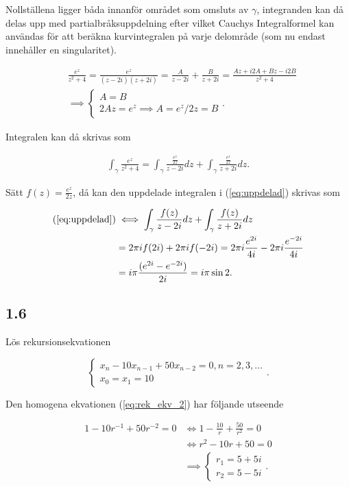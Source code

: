 \documentclass[a4paper]{article}
\begin{document}
Nollställena ligger båda innanför området som omsluts av $\gamma$, integranden kan då delas upp med partialbråksuppdelning efter vilket Cauchys Integralformel kan användas för att beräkna kurvintegralen på varje delområde (som nu endast innehåller en singularitet).

\begin{align*}
	&\frac{e^z}{z^2 + 4} = \frac{e^z}{(z-2i)(z+2i)} = \frac{A}{z-2i} + \frac{B}{z+2i} = \frac{Az + i2A + Bz - i2B}{z^2 + 4}\\
	&\implies	\begin{cases}
					A = B\\
					2Az = e^z \implies A = e^z/2z = B
				\end{cases}.
\end{align*}

Integralen kan då skrivas som

\begin{align}
	\int_\gamma \frac{e^z}{z^2 + 4} = \int_\gamma \frac{\frac{e^z}{2z}}{z-2i}dz + \int_\gamma \frac{\frac{e^z}{2z}}{z+2i}dz.\label{eq:uppdelad}
\end{align}

Sätt $f(z) = \frac{e^z}{2z}$, då kan den uppdelade integralen i (\ref{eq:uppdelad}) skrivas som

\begin{align*}
	(\ref{eq:uppdelad}) &\iff \int_\gamma \frac{f(z)}{z-2i}dz + \int_\gamma \frac{f(z)}{z+2i}dz\\
		&= 2\pi i f(2i) + 2\pi i f(-2i) = 2\pi i \frac{e^{2i}}{4i} - 2\pi i \frac{e^{-2i}}{4i}\\
		&= i\pi\frac{(e^{2i} - e^{-2i})}{2i} = i\pi\sin 2.
\end{align*}

\subsection*{1.6}

Lös rekursionsekvationen

\begin{equation}
	\begin{cases}
		x_{n} - 10x_{n-1} + 50x_{n-2} = 0, n = 2,3,...\\
		x_0 = x_1 = 10
	\end{cases}\label{eq:rek_ekv_2}.
\end{equation}

Den homogena ekvationen (\ref{eq:rek_ekv_2}) har följande utseende

\begin{align*}
	1 - 10r^{-1} + 50r^{-2} = 0 &\iff 1 - \frac{10}{r} + \frac{50}{r^2} = 0\\
								&\iff r^2 - 10r + 50 = 0\\
								&\implies	\begin{cases}
												r_1 = 5 + 5i\\
												r_2 = 5 - 5i
											\end{cases}.
\end{align*}
\end{document}
